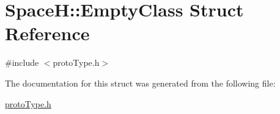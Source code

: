 \hypertarget{struct_space_h_1_1_empty_class}{}\section{SpaceH\+:\+:Empty\+Class Struct Reference}
\label{struct_space_h_1_1_empty_class}


{\ttfamily \#include $<$proto\+Type.\+h$>$}



The documentation for this struct was generated from the following file\+:\begin{DoxyCompactItemize}
\item 
\mbox{\hyperlink{proto_type_8h}{proto\+Type.\+h}}\end{DoxyCompactItemize}
